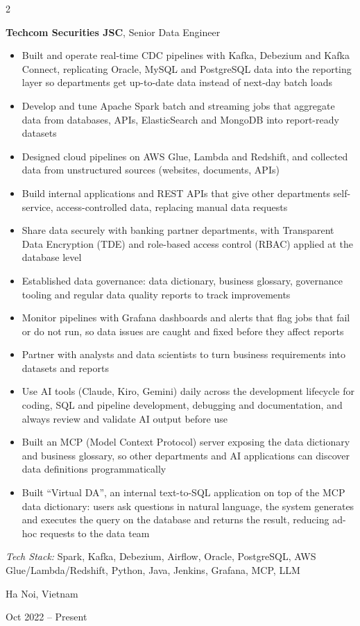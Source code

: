\documentclass[10pt, letterpaper]{article}
\newenvironment{highlights}{
    \begin{itemize}[
        topsep=0.10 cm,
        parsep=0.10 cm,
        partopsep=0pt,
        itemsep=0pt,
        leftmargin=0.4 cm + 10pt
    ]
    }{
    \end{itemize}
} %
\newenvironment{twocolentry}[2][]{
    \onecolentry
    \def\secondColumn{#2}
    \setcolumnwidth{\fill, 4.5 cm}
    \begin{paracol}{2}
    }{
        \switchcolumn \raggedleft \secondColumn
    \end{paracol}
    \endonecolentry
} %
\begin{document}
    \begin{twocolentry}{
        Ha Noi, Vietnam

        Oct 2022 -- Present
    }
        \textbf{Techcom Securities JSC}, Senior Data Engineer
        \begin{highlights}
            \item Built and operate real-time CDC pipelines with Kafka, Debezium and Kafka Connect, replicating Oracle, MySQL and PostgreSQL data into the reporting layer so departments get up-to-date data instead of next-day batch loads
            \item Develop and tune Apache Spark batch and streaming jobs that aggregate data from databases, APIs, ElasticSearch and MongoDB into report-ready datasets
            \item Designed cloud pipelines on AWS Glue, Lambda and Redshift, and collected data from unstructured sources (websites, documents, APIs)
            \item Build internal applications and REST APIs that give other departments self-service, access-controlled data, replacing manual data requests
            \item Share data securely with banking partner departments, with Transparent Data Encryption (TDE) and role-based access control (RBAC) applied at the database level
            \item Established data governance: data dictionary, business glossary, governance tooling and regular data quality reports to track improvements
            \item Monitor pipelines with Grafana dashboards and alerts that flag jobs that fail or do not run, so data issues are caught and fixed before they affect reports
            \item Partner with analysts and data scientists to turn business requirements into datasets and reports
            \item Use AI tools (Claude, Kiro, Gemini) daily across the development lifecycle for coding, SQL and pipeline development, debugging and documentation, and always review and validate AI output before use
            \item Built an MCP (Model Context Protocol) server exposing the data dictionary and business glossary, so other departments and AI applications can discover data definitions programmatically
            \item Built ``Virtual DA'', an internal text-to-SQL application on top of the MCP data dictionary: users ask questions in natural language, the system generates and executes the query on the database and returns the result, reducing ad-hoc requests to the data team
        \end{highlights}
        \textit{Tech Stack:} Spark, Kafka, Debezium, Airflow, Oracle, PostgreSQL, AWS Glue/Lambda/Redshift, Python, Java, Jenkins, Grafana, MCP, LLM
    \end{twocolentry}
\end{document}
